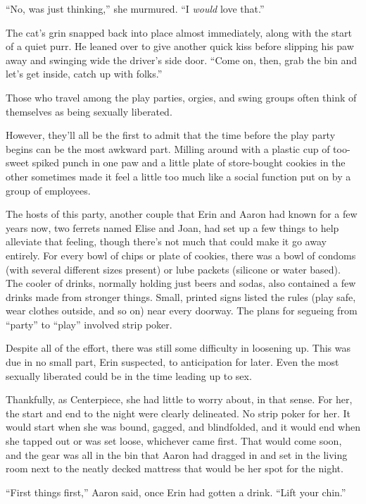 ``No, was just thinking,'' she murmured. ``I \emph{would} love that.''

The cat's grin snapped back into place almost immediately, along with the start of a quiet purr. He leaned over to give another quick kiss before slipping his paw away and swinging wide the driver's side door. ``Come on, then, grab the bin and let's get inside, catch up with folks.''

\secdiv{}

\noindent Those who travel among the play parties, orgies, and swing groups often think of themselves as being sexually liberated.

However, they'll all be the first to admit that the time before the play party begins can be the most awkward part. Milling around with a plastic cup of too-sweet spiked punch in one paw and a little plate of store-bought cookies in the other sometimes made it feel a little too much like a social function put on by a group of employees.

The hosts of this party, another couple that Erin and Aaron had known for a few years now, two ferrets named Elise and Joan, had set up a few things to help alleviate that feeling, though there's not much that could make it go away entirely. For every bowl of chips or plate of cookies, there was a bowl of condoms (with several different sizes present) or lube packets (silicone or water based). The cooler of drinks, normally holding just beers and sodas, also contained a few drinks made from stronger things. Small, printed signs listed the rules (play safe, wear clothes outside, and so on) near every doorway. The plans for segueing from ``party'' to ``play'' involved strip poker.

Despite all of the effort, there was still some difficulty in loosening up. This was due in no small part, Erin suspected, to anticipation for later. Even the most sexually liberated could be in the time leading up to sex.

Thankfully, as Centerpiece, she had little to worry about, in that sense. For her, the start and end to the night were clearly delineated. No strip poker for her. It would start when she was bound, gagged, and blindfolded, and it would end when she tapped out or was set loose, whichever came first. That would come soon, and the gear was all in the bin that Aaron had dragged in and set in the living room next to the neatly decked mattress that would be her spot for the night.

``First things first,'' Aaron said, once Erin had gotten a drink. ``Lift your chin.''


